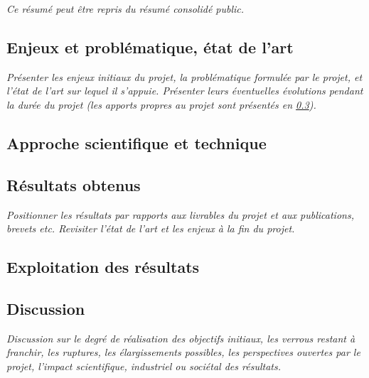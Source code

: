 \documentclass[a4paper,11pt]{article}
\newcommand{\instructions}[1]{%
		{%
			\setlength{\parindent}{0cm}%
			{\em\color{ANRvert}#1}%
		}%
	}
\newcommand{\instructions}[1]{}
\begin{document}
\instructions{Ce résumé peut être repris du résumé consolidé public.}

\subsection{Enjeux et problématique, état de l'art}

\instructions{Présenter les enjeux initiaux du projet, la problématique formulée par le projet, et l'état de l'art sur lequel il s'appuie. Présenter leurs éventuelles évolutions pendant la durée du projet (les apports propres au projet sont présentés en \cref{subsection-resultats}).}

\subsection{Approche scientifique et technique}



\subsection{Résultats obtenus}\label{subsection-resultats}

\instructions{Positionner les résultats par rapports aux livrables du projet et aux publications, brevets etc. Revisiter l'état de l'art et les enjeux à la fin du projet.}

\subsection{Exploitation des résultats}



\subsection{Discussion}

\instructions{Discussion sur le degré de réalisation des objectifs initiaux, les verrous restant à franchir, les ruptures, les élargissements possibles, les perspectives ouvertes par le projet, l'impact scientifique, industriel ou sociétal des résultats. }
\end{document}
